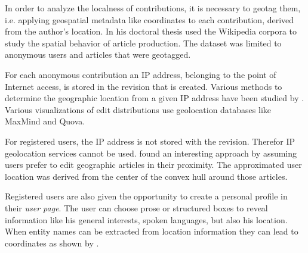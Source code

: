In order to analyze the localness of contributions, it is necessary to geotag them, i.e. applying geospatial metadata like coordinates to each contribution, derived from the author's location.
In his doctoral thesis \textcite{hardy2011volunteered} used the Wikipedia corpora to study the spatial behavior of article production.
The dataset was limited to anonymous users and articles that were geotagged.

For each anonymous contribution an IP address, belonging to the point of Internet access, is stored in the revision that is created.
Various methods to determine the geographic location from a given IP address have been studied by \textcite{muir2009internet}.
Various visualizations  of edit distributions use geolocation databases like MaxMind and Quova.

For registered users, the IP address is not stored with the revision.
Therefor IP geolocation services cannot be used.
\textcite{lieberman2009you} found an interesting approach by assuming users prefer to edit geographic articles in their proximity.
The approximated user location was derived from the center of the convex hull around those articles.

Registered users are also given the opportunity to create a personal profile in their \emph{user page}.
The user can choose prose or structured boxes to reveal information like his general interests, spoken languages, but also his location.
When entity names can be extracted from location information they can lead to coordinates as shown by \textcite{hecht2010localness}.